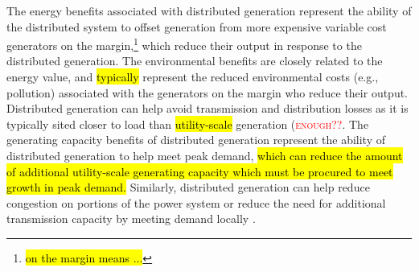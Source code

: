 The energy benefits associated with distributed generation represent the ability of the distributed system to offset generation from more expensive variable cost generators on the margin,\footnote{\hl{on the margin means ...}} which reduce their output in response to the distributed generation. The environmental benefits are closely related to the energy value, and \hl{typically} represent the reduced environmental costs (e.g., pollution) associated with the generators on the margin who reduce their output. Distributed generation can help avoid transmission and distribution losses as it is typically sited closer to load than \hl{utility-scale} generation (\textcolor{red}{\textsc{enough??}}. The generating capacity benefits of distributed generation represent the ability of distributed generation to help meet peak demand, \hl{which can reduce the amount of additional utility-scale generating capacity which must be procured to meet growth in peak demand.} Similarly, distributed generation can help reduce congestion on portions of the power system or reduce the need for additional transmission capacity by meeting demand locally \cite{denholm_methods_2014}.

